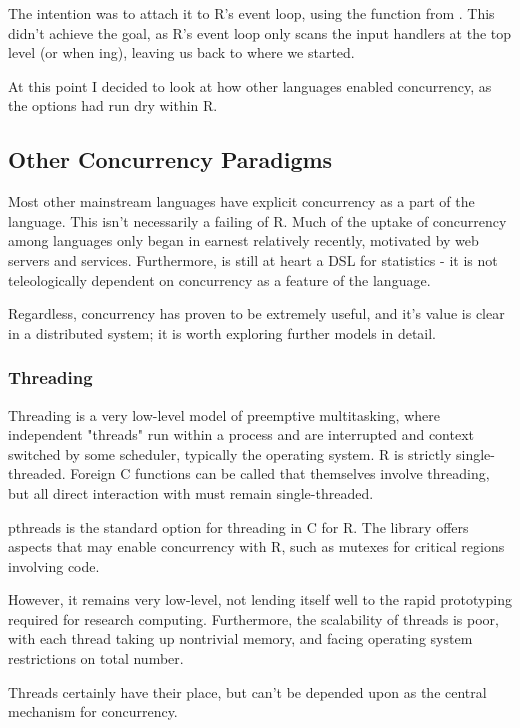 The intention was to attach it to R's event loop, using the  function from .
This didn't achieve the goal, as R's event loop only scans the input handlers at the top level (or when ing), leaving us back to where we started.

At this point I decided to look at how other languages enabled concurrency, as the options had run dry within R.

\subsection{Other Concurrency Paradigms}

Most other mainstream languages have explicit concurrency as a part of the language.
This isn't necessarily a failing of R.
Much of the uptake of concurrency among languages only began in earnest relatively recently, motivated by web servers and services.
Furthermore, \R is still at heart a DSL for statistics - it is not teleologically dependent on concurrency as a feature of the language.

Regardless, concurrency has proven to be extremely useful, and it's value is clear in a distributed system;
it is worth exploring further models in detail.

\subsubsection{Threading}

Threading is a very low-level model of preemptive multitasking, where independent "threads" run within a process and are interrupted and context switched by some scheduler, typically the operating system.
R is strictly single-threaded.
Foreign C functions can be called that themselves involve threading, but all direct interaction with \R must remain single-threaded.

pthreads\cite{nichols1996pthreads} is the standard option for threading in C for R.
The library offers aspects that may enable concurrency with R, such as mutexes for critical regions involving \R code.

However, it remains very low-level, not lending itself well to the rapid prototyping required for research computing.
Furthermore, the scalability of threads is poor, with each thread taking up nontrivial memory, and facing operating system restrictions on total number.

Threads certainly have their place, but can't be depended upon as the central mechanism for concurrency.

